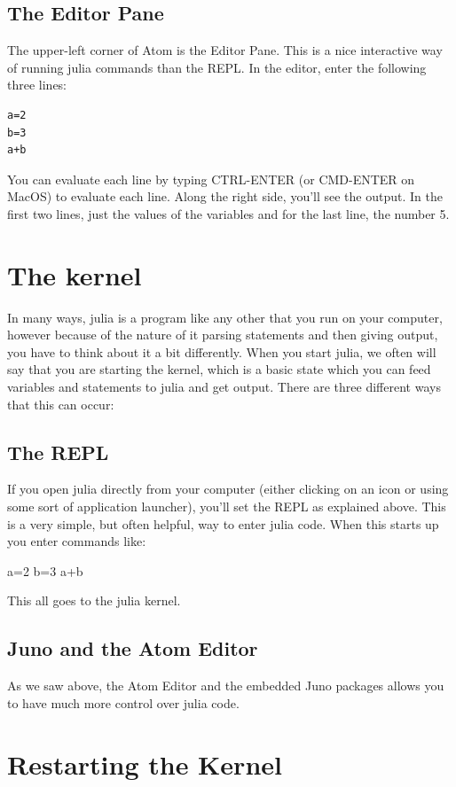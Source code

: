 \subsection{The Editor Pane}

The upper-left corner of Atom is the Editor Pane.  This is a nice interactive way of running julia commands than the REPL.  In the editor, enter the following three lines:

\begin{Verbatim}
a=2
b=3
a+b
\end{Verbatim}

You can evaluate each line by typing CTRL-ENTER (or CMD-ENTER on MacOS) to evaluate each line.  Along the right side, you'll see the output.  In the first two lines, just the values of the variables and for the last line, the number 5. 


\section{The kernel} \label{sect:kernel}

In many ways, julia is a program like any other that you run on your computer, however because of the nature of it parsing statements and then giving output, you have to think about it a bit differently. When you start julia, we often will say that you are starting the kernel, which is a basic state which you can feed variables and statements to julia and get output.  There are three different ways that this can occur:

\subsection{The REPL}

If you open julia directly from your computer (either clicking on an icon or using some sort of application launcher), you'll set the REPL as explained above.  This is a very simple, but often helpful, way to enter julia code.  When this starts up you enter commands like:

\begin{jlblock}[start]
a=2
b=3
a+b
\end{jlblock}

This all goes to the julia kernel.  

\subsection{Juno and the Atom Editor}

As we saw above, the Atom Editor and the embedded Juno packages allows you to have much more control over julia code. 



\section{Restarting the Kernel}

